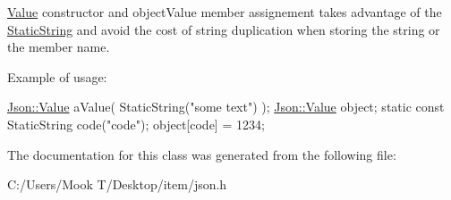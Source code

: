 \hyperlink{class_json_1_1_value}{Value} constructor and object\+Value member assignement takes advantage of the \hyperlink{class_json_1_1_static_string}{Static\+String} and avoid the cost of string duplication when storing the string or the member name.

Example of usage\+: 
\begin{DoxyCode}
\hyperlink{class_json_1_1_value}{Json::Value} aValue( StaticString(\textcolor{stringliteral}{"some text"}) );
\hyperlink{class_json_1_1_value}{Json::Value} object;
\textcolor{keyword}{static} \textcolor{keyword}{const} StaticString code(\textcolor{stringliteral}{"code"});
\textcolor{keywordtype}{object}[code] = 1234;
\end{DoxyCode}
 

The documentation for this class was generated from the following file\+:\begin{DoxyCompactItemize}
\item 
C\+:/\+Users/\+Mook T/\+Desktop/item/json.\+h\end{DoxyCompactItemize}
